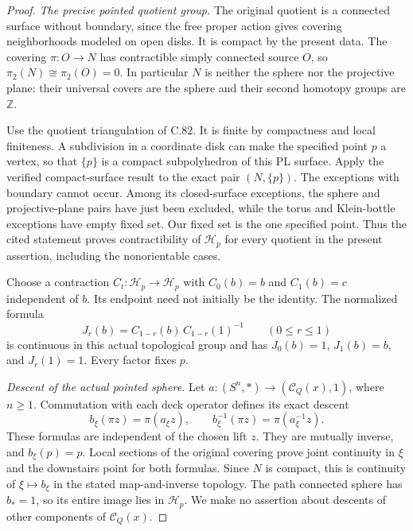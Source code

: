 \begin{proof}
\emph{The precise pointed quotient group.}
The original quotient is a connected surface
without boundary, since the free proper action
gives covering neighborhoods modeled on open
disks. It is compact by the present data.
The covering $\pi:O\to N$ has contractible
simply connected source $O$, so
$\pi_2(N)\cong\pi_2(O)=0$.
In particular $N$ is neither the sphere nor
the projective plane: their universal covers
are the sphere and their second homotopy
groups are $\mathbb Z$.

Use the quotient triangulation of C.82.
It is finite by compactness and local
finiteness. A subdivision in a coordinate
disk can make the specified point $p$
a vertex, so that $\{p\}$ is a compact
subpolyhedron of this PL surface.
Apply the verified compact-surface result
\cite[Lemma~2.1(i), p.~2; proof, p.~3]{C_Yagasaki2000}
to the exact pair $(N,\{p\})$.
The exceptions with boundary cannot occur.
Among its closed-surface exceptions, the
sphere and projective-plane pairs have just
been excluded, while the torus and
Klein-bottle exceptions have empty fixed
set. Our fixed set is the one specified
point. Thus the cited statement proves
contractibility of $\mathscr H_p$ for every
quotient in the present assertion, including
the nonorientable cases.

Choose a contraction
$C_t:\mathscr H_p\to\mathscr H_p$ with
$C_0(b)=b$ and $C_1(b)=c$ independent of $b$.
Its endpoint need not initially be the
identity. The normalized formula
\[
           J_r(b)=C_{1-r}(b)\,C_{1-r}(1)^{-1}
                        \qquad(0\leq r\leq1)
                                                               \tag{C.90.3}
\]
is continuous in this actual topological
group and has
$J_0(b)=1$, $J_1(b)=b$, and $J_r(1)=1$.
Every factor fixes $p$.

\emph{Descent of the actual pointed sphere.}
Let $a:(S^n,*)\to(\mathscr C_Q(x),1)$,
where $n\geq1$. Commutation with each
deck operator defines its exact descent
\[
 b_\xi(\pi z)=\pi(a_\xi z),\qquad
 b_\xi^{-1}(\pi z)=\pi(a_\xi^{-1}z).
                                                               \tag{C.90.4}
\]
These formulas are independent of the
chosen lift $z$. They are mutually
inverse, and $b_\xi(p)=p$.
Local sections of the original covering
prove joint continuity in $\xi$ and the
downstairs point for both formulas.
Since $N$ is compact, this is continuity
of $\xi\mapsto b_\xi$ in the stated
map-and-inverse topology. The path
connected sphere has $b_*=1$, so its
entire image lies in $\mathscr H_p$.
We make no assertion about descents of
other components of $\mathscr C_Q(x)$.


\end{proof}

